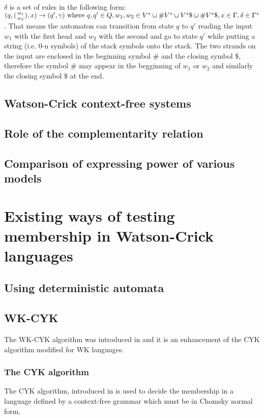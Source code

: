 $\delta$ is a set of rules in the following form: $(q, ({w_1 \atop w_2}), x) \rightarrow (q', \gamma) \textnormal{ where } q, q' \in Q, w_1, w_2 \in V^* \cup \#V^* \cup V^*\$ \cup \#V^*\$, x \in \Gamma, \delta \in \Gamma^*$. That means the automaton can transition from state $q$ to $q'$ reading the input $w_1$ with the first head and $w_2$ with the second and go to state $q'$ while putting a string (i.e. 0-n symbols) of the stack symbols onto the stack. The two strands on the input are enclosed in the beginning symbol $\#$ and the closing symbol $\$$, therefore the symbol $\#$ may appear in the begginning of $w_1$ or $w_2$ and similarly the closing symbol $\$$ at the end.




\section{Watson-Crick context-free systems}

\section{Role of the complementarity relation}

\section{Comparison of expressing power of various models}

\chapter{Existing ways of testing membership in Watson-Crick languages}

\section{Using deterministic automata}

\section{WK-CYK}
The WK-CYK algorithm was introduced in \cite{WK_CYK} and it is an enhancement of the CYK algorithm modified for WK languages.
\subsection{The CYK algorithm}
The CYK algorithm, introduced in  is used to decide the membership in a language defined by a context-free grammar which must be in Chomsky normal form.

